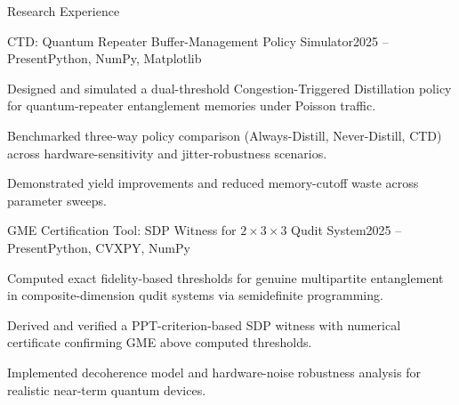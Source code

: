 \documentclass{resume} %
\begin{document}
\begin{rSection}{Research Experience}
\begin{rSubsection}{CTD: Quantum Repeater Buffer-Management Policy Simulator}{2025 – Present}{Python, NumPy, Matplotlib}{}
\item Designed and simulated a dual-threshold Congestion-Triggered Distillation policy for quantum-repeater entanglement memories under Poisson traffic.
\item Benchmarked three-way policy comparison (Always-Distill, Never-Distill, CTD) across hardware-sensitivity and jitter-robustness scenarios.
\item Demonstrated yield improvements and reduced memory-cutoff waste across parameter sweeps.
\end{rSubsection}
\vspace{.1cm}

\begin{rSubsection}{GME Certification Tool: SDP Witness for $2\times3\times3$ Qudit System}{2025 – Present}{Python, CVXPY, NumPy}{}
\item Computed exact fidelity-based thresholds for genuine multipartite entanglement in composite-dimension qudit systems via semidefinite programming.
\item Derived and verified a PPT-criterion-based SDP witness with numerical certificate confirming GME above computed thresholds.
\item Implemented decoherence model and hardware-noise robustness analysis for realistic near-term quantum devices.
\end{rSubsection}
\vspace{.1cm}

\end{rSection}


\end{document}
